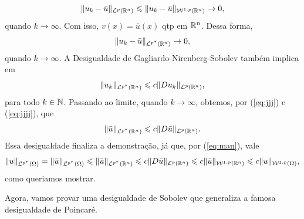 \begin{prf}
    \begin{equation} \label{eq:jjjj}
        \Vert u_k - \bar u \Vert_{\mathcal{L}^p(\mathbb{R}^n)} \leqslant \Vert u_k - \bar u \Vert_{\mathcal{W}^{1,p}(\mathbb{R}^n)} \to 0,
    \end{equation}
    quando $k \to \infty$. Com isso, $v(x) = \bar u(x)$ qtp em $\mathbb{R}^n$.
    Dessa forma,
    \[
        \Vert u_k - \bar u \Vert_{\mathcal{L}^{p^*}(\mathbb{R}^n)} \to 0,
    \]
    quando $k \to \infty$.
    A Desigualdade de Gagliardo-Nirenberg-Sobolev também implica em
    \[  
        \Vert u_k \Vert_{\mathcal{L}^{p^*}(\mathbb{R}^n)} \leqslant c \Vert Du_k \Vert_{\mathcal{L}^p(\mathbb{R}^n)},
    \]
    para todo $k \in \mathbb{N}$.
    Passando ao limite, quando $k \to \infty$, obtemos, por (\ref{eq:jjj}) e (\ref{eq:jjjj}), que
    \[
        \Vert \bar u \Vert_{\mathcal{L}^{p^*}(\mathbb{R}^n)} \leqslant c \Vert D \bar u \Vert_{\mathcal{L}^p(\mathbb{R}^n)}.
    \]
    Essa desigualdade finaliza a demonstração, já que, por (\ref{eq:man}), vale
    \[
        \Vert u \Vert_{\mathcal{L}^{p^*}(\Omega)} = \Vert \bar u \Vert_{\mathcal{L}^{p^*}(\Omega)} \leqslant \Vert \bar u \Vert_{\mathcal{L}^{p^*}(\mathbb{R}^n)} \leqslant c \Vert D \bar u \Vert_{\mathcal{L}^p(\mathbb{R}^n)} \leqslant c \Vert \bar u \Vert_{\mathcal{W}^{1,p}(\mathbb{R}^n)} \leqslant c \Vert u \Vert_{\mathcal{W}^{1,p}(\Omega)},
    \]
    como queriamos mostrar.
\end{prf}

Agora, vamos provar uma desigualdade de Sobolev que generaliza a famosa desigualdade de Poincaré.

